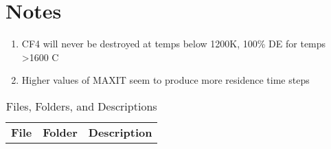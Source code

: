 \documentclass{article}
\begin{document}
\section*{Notes}
\begin{enumerate}
    \item CF4 will never be destroyed at temps below 1200K, 100\% DE for temps >1600 C
    \item Higher values of MAXIT seem to produce more residence time steps
\end{enumerate}
\pagebreak
\begin{table}[H] %
\centering
\renewcommand{\arraystretch}{1.256}
\caption{Files, Folders, and Descriptions}
\begin{tabular}{>{\centering\arraybackslash}m{}>{\scriptsize\centering\arraybackslash}m{}>{\footnotesize\centering\arraybackslash}m{}}\toprule

\normalsize{\textbf{File}} & \normalsize{\textbf{Folder}} & \normalsize{\textbf{Description}} \\\cmidrule(r){1-1}\cmidrule(lr){2-2}\cmidrule(l){3-3}


\end{tabular}
\end{table}
\end{document}
